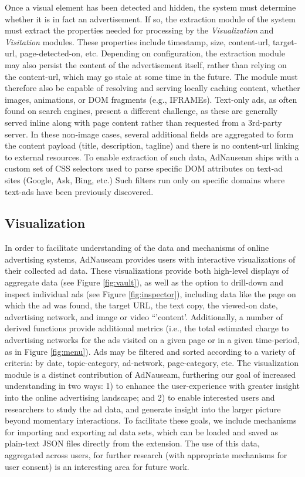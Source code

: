\documentclass[conference]{IEEEtran}
\begin{document}
Once a visual element has been detected and hidden, the system must  determine whether it is in fact an advertisement. If so, the extraction module of the system must extract the properties needed for processing by the \emph{Visualization} and \emph{Visitation} modules. These properties include timestamp, size, content-url, target-url, page-detected-on, etc. Depending on configuration, the extraction module may also persist the content of the advertisement itself, rather than relying on the content-url, which may go stale at some time in the future. The module must therefore also be capable of resolving and serving locally caching content, whether images, animations, or DOM fragments (e.g., IFRAMEs). Text-only ads, as often found on search engines, present a different challenge, as these are generally served inline along with page content rather than requested from a 3rd-party server. In these non-image cases, several additional fields are aggregated to form the content payload (title, description, tagline) and there is no content-url linking to external resources. To enable extraction of such data, AdNauseam ships with a custom set of CSS selectors used to parse specific DOM attributes on text-ad sites (Google, Ask, Bing, etc.) Such filters run only on specific domains where text-ads have been previously discovered.

\subsection{Visualization}

In order to facilitate understanding of the data and mechanisms of online advertising systems, AdNauseam provides users with interactive visualizations of their collected ad data. These visualizations provide both high-level displays of aggregate data (see Figure \ref{fig:vault}), as well as the option to drill-down and inspect individual ads (see Figure \ref{fig:inspector}), including data like the page on which the ad was found, the target URL, the text copy, the viewed-on date, advertising network, and image or video “'content'. Additionally, a number of derived functions provide additional metrics (i.e., the total estimated charge to advertising networks for the ads visited on a given page or in a given time-period, as in Figure \ref{fig:menu}). Ads may be filtered and sorted according to a variety of criteria: by date, topic-category, ad-network, page-category, etc. The visualization module is a distinct contribution of AdNauseam, furthering our goal of increased understanding in two ways: 1) to enhance the user-experience with greater insight into the online advertising landscape; and 2) to enable interested users and researchers to study the ad data, and generate insight into the larger picture beyond momentary interactions. To facilitate these goals, we include mechanisms for importing and exporting ad data sets, which can be loaded and saved as plain-text JSON files directly from the extension. The use of this data, aggregated across users, for further research (with appropriate mechanisms for user consent) is an interesting area for future work.
\end{document}
